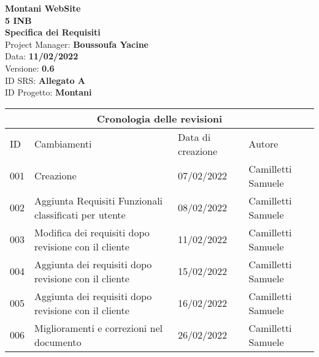 \documentclass{article}
\begin{document}
	
	
	\begin{titlepage}
		\begin{center}
			\huge\textbf{Montani WebSite}\\
			\Large\textbf{5 INB}\\
			\Large \textbf{Specifica dei Requisiti}\\
			\vspace{4cm}
			\large Project Manager: \textbf{Boussoufa Yacine}\\
			\large Data: \textbf{11/02/2022}\\
			\large Versione: \textbf{0.6}\\
			\large ID SRS: \textbf{Allegato A}\\
			\large ID Progetto: \textbf{Montani}\\
			
		\end{center}
	\end{titlepage}
	
	\clearpage
	
	\begin{tabular}{ |p{1cm}|p{4cm}|p{3cm}|p{2cm}|  }
		\hline
		\multicolumn{4}{|c|}{Cronologia delle revisioni} \\
		\hline
		ID& Cambiamenti &Data di creazione&Autore\\
		\hline
		001   & Creazione    &07/02/2022&   Camilletti Samuele\\
		\hline
		002   & Aggiunta Requisiti Funzionali classificati per utente    &08/02/2022&   Camilletti Samuele\\
		\hline
		003   & Modifica dei requisiti dopo revisione con il cliente    &11/02/2022&   Camilletti Samuele\\
		\hline
		004   & Aggiunta dei requisiti dopo revisione con il cliente    &15/02/2022&   Camilletti Samuele\\
\hline
		005   & Aggiunta dei requisiti dopo revisione con il cliente    &16/02/2022&   Camilletti Samuele\\
\hline
		006   & Miglioramenti e correzioni nel documento   &26/02/2022&   Camilletti Samuele\\
\hline
	\end{tabular}
	
	\clearpage
	
	\tableofcontents
	\printindex	
	
   

\end{document}
